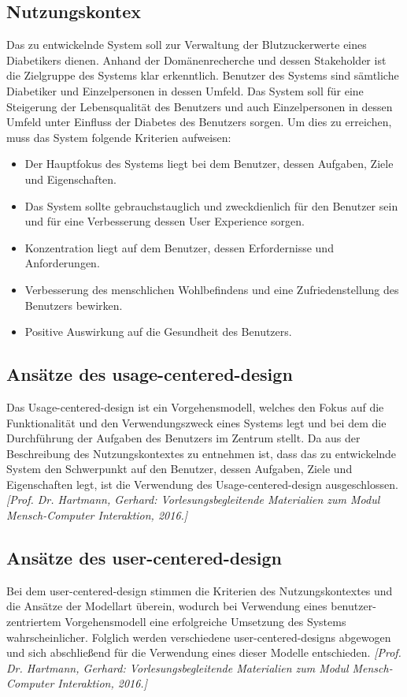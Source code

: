 \documentclass[a4paper,11pt]{article}%
\renewcommand{\\}{\vspace*{0.5\baselineskip} \newline}
\begin{document}
		\subsection{Nutzungskontex}
			Das zu entwickelnde System soll zur Verwaltung der Blutzuckerwerte eines Diabetikers dienen. Anhand der Domänenrecherche und dessen Stakeholder ist die Zielgruppe des Systems klar erkenntlich. Benutzer des Systems sind sämtliche Diabetiker und Einzelpersonen in dessen Umfeld. Das System soll für eine Steigerung der Lebensqualität des Benutzers und auch Einzelpersonen in dessen Umfeld unter Einfluss der Diabetes des Benutzers sorgen. Um dies zu erreichen, muss das System folgende Kriterien aufweisen:
			\begin{itemize}
				\item Der Hauptfokus des Systems liegt bei dem Benutzer, dessen Aufgaben, Ziele und Eigenschaften.
				\item Das System sollte gebrauchstauglich und zweckdienlich für den Benutzer sein und für eine Verbesserung dessen User Experience sorgen.
				\item Konzentration liegt auf dem Benutzer, dessen Erfordernisse und Anforderungen.
				\item Verbesserung des menschlichen Wohlbefindens und eine Zufriedenstellung des Benutzers bewirken.
				\item Positive Auswirkung auf die Gesundheit des Benutzers.
			\end{itemize}
		\subsection{Ansätze des usage-centered-design}
			Das Usage-centered-design ist ein Vorgehensmodell, welches den Fokus auf die Funktionalität und den Verwendungszweck eines Systems legt und bei dem die Durchführung der Aufgaben des Benutzers im Zentrum stellt. Da aus der Beschreibung des Nutzungskontextes zu entnehmen ist, dass das zu entwickelnde System den Schwerpunkt auf den Benutzer, dessen Aufgaben, Ziele und Eigenschaften legt, ist die Verwendung des Usage-centered-design ausgeschlossen. \emph{[Prof. Dr. Hartmann, Gerhard: Vorlesungsbegleitende Materialien zum Modul Mensch-Computer Interaktion, 2016.]}
		\subsection{Ansätze des user-centered-design}
			Bei dem user-centered-design stimmen die Kriterien des Nutzungskontextes und die Ansätze der Modellart überein, wodurch bei Verwendung eines benutzer-zentriertem Vorgehensmodell eine erfolgreiche Umsetzung des Systems wahrscheinlicher. Folglich werden verschiedene user-centered-designs abgewogen und sich abschließend für die Verwendung eines dieser Modelle entschieden. \emph{[Prof. Dr. Hartmann, Gerhard: Vorlesungsbegleitende Materialien zum Modul Mensch-Computer Interaktion, 2016.]}
\end{document}
